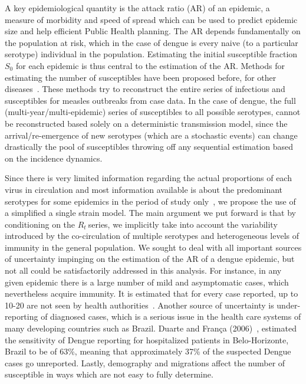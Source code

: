 \documentclass[10pt]{article}
\def \rr {$R_{t}\:$}
\begin{document}
A key epidemiological quantity is the attack ratio (AR) of an epidemic, a 
measure of morbidity and speed of spread which can be used to predict epidemic 
size and help efficient Public Health planning.
The AR depends fundamentally on the population at risk, which in the case of 
dengue is every naive (to a particular serotype) individual in the population.
Estimating the initial susceptible fraction $S_0$ for each epidemic is thus 
central to the estimation of the AR.
Methods for estimating the  number of susceptibles have been proposed 
before, for other diseases~\cite{bjornstad_dynamics_2002, 
wallinga_reconstruction_2003}.
These methods try to reconstruct the entire 
series of infectious and susceptibles for measles 
outbreaks from case data.
In the case of dengue, the full (multi-year/multi-epidemic)
series of susceptibles to all possible serotypes, cannot be reconstructed based 
solely on a deterministic transmission model, since the arrival/re-emergence of 
new serotypes (which are a stochastic events) can change drastically the pool 
of susceptibles throwing off any sequential estimation based on the incidence
dynamics.

Since there is very limited information regarding the actual proportions of 
each virus in circulation and most information available is about the 
predominant serotypes for some epidemics in the period of 
study only~\cite{macedo_virological_2013}, we propose the use of a 
simplified a single strain model.
The main argument we put forward is that by conditioning on the \rr series, we 
implicitly take into account the variability introduced by the 
co-circulation of multiple serotypes and heterogeneous levels of immunity in 
the general population.
We sought to deal with all important sources of uncertainty impinging on the 
estimation of the AR of a dengue epidemic, but not all could be satisfactorily 
addressed in this analysis.
For instance, in any given epidemic there is a large number of 
mild and asymptomatic cases, which nevertheless acquire immunity.
It is estimated that for every case reported, up to 10-20 are not seen by health 
authorities~\cite{luz_disability_2009}.
Another source of uncertainty is under-reporting of diagnosed cases, which is a 
serious issue in the health care systems of many developing countries such as 
Brazil. 
Duarte and Fran\c{c}a (2006)~\cite{duarte_data_2006}, estimated 
the sensitivity of Dengue reporting for hospitalized patients in 
Belo-Horizonte, Brazil to be of 63\%, meaning that approximately 37\% of the 
suspected Dengue cases go unreported.  
Lastly, demography and migrations affect the number of susceptible in ways 
which are not easy to fully determine.
\end{document}
